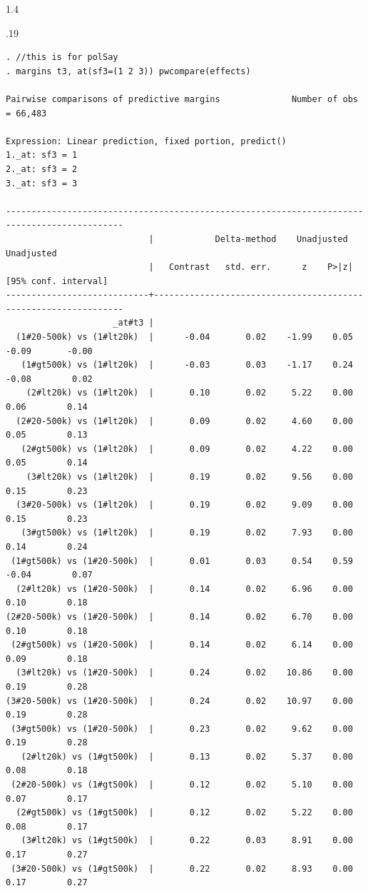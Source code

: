 \documentclass[10pt, letterpaper]{article}
\begin{document}
\begin{spacing}{1.4}
\begin{scriptsize}
\begin{spacing}{.19}
\begin{verbatim}
. //this is for polSay
. margins t3, at(sf3=(1 2 3)) pwcompare(effects)

Pairwise comparisons of predictive margins              Number of obs = 66,483

Expression: Linear prediction, fixed portion, predict()
1._at: sf3 = 1
2._at: sf3 = 2
3._at: sf3 = 3

---------------------------------------------------------------------------------------------
                            |            Delta-method    Unadjusted           Unadjusted
                            |   Contrast   std. err.      z    P>|z|     [95% conf. interval]
----------------------------+----------------------------------------------------------------
                     _at#t3 |
  (1#20-500k) vs (1#lt20k)  |      -0.04       0.02    -1.99    0.05        -0.09       -0.00
   (1#gt500k) vs (1#lt20k)  |      -0.03       0.03    -1.17    0.24        -0.08        0.02
    (2#lt20k) vs (1#lt20k)  |       0.10       0.02     5.22    0.00         0.06        0.14
  (2#20-500k) vs (1#lt20k)  |       0.09       0.02     4.60    0.00         0.05        0.13
   (2#gt500k) vs (1#lt20k)  |       0.09       0.02     4.22    0.00         0.05        0.14
    (3#lt20k) vs (1#lt20k)  |       0.19       0.02     9.56    0.00         0.15        0.23
  (3#20-500k) vs (1#lt20k)  |       0.19       0.02     9.09    0.00         0.15        0.23
   (3#gt500k) vs (1#lt20k)  |       0.19       0.02     7.93    0.00         0.14        0.24
 (1#gt500k) vs (1#20-500k)  |       0.01       0.03     0.54    0.59        -0.04        0.07
  (2#lt20k) vs (1#20-500k)  |       0.14       0.02     6.96    0.00         0.10        0.18
(2#20-500k) vs (1#20-500k)  |       0.14       0.02     6.70    0.00         0.10        0.18
 (2#gt500k) vs (1#20-500k)  |       0.14       0.02     6.14    0.00         0.09        0.18
  (3#lt20k) vs (1#20-500k)  |       0.24       0.02    10.86    0.00         0.19        0.28
(3#20-500k) vs (1#20-500k)  |       0.24       0.02    10.97    0.00         0.19        0.28
 (3#gt500k) vs (1#20-500k)  |       0.23       0.02     9.62    0.00         0.19        0.28
   (2#lt20k) vs (1#gt500k)  |       0.13       0.02     5.37    0.00         0.08        0.18
 (2#20-500k) vs (1#gt500k)  |       0.12       0.02     5.10    0.00         0.07        0.17
  (2#gt500k) vs (1#gt500k)  |       0.12       0.02     5.22    0.00         0.08        0.17
   (3#lt20k) vs (1#gt500k)  |       0.22       0.03     8.91    0.00         0.17        0.27
 (3#20-500k) vs (1#gt500k)  |       0.22       0.02     8.93    0.00         0.17        0.27

\end{verbatim}
\end{spacing}
\end{scriptsize}
\end{spacing}
\end{document}
